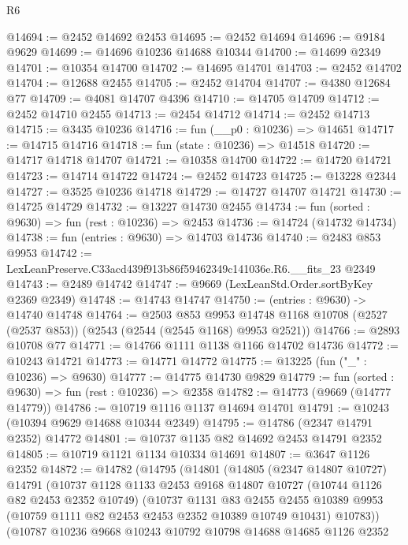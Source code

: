 \begin{lexlean}{R6}
\begin{coremodule}
@14694 := @2452 @14692 @2453
@14695 := @2452 @14694
@14696 := @9184 @9629
@14699 := @14696 @10236 @14688 @10344
@14700 := @14699 @2349
@14701 := @10354 @14700
@14702 := @14695 @14701
@14703 := @2452 @14702
@14704 := @12688 @2455
@14705 := @2452 @14704
@14707 := @4380 @12684 @77
@14709 := @4081 @14707 @4396
@14710 := @14705 @14709
@14712 := @2452 @14710 @2455
@14713 := @2454 @14712
@14714 := @2452 @14713
@14715 := @3435 @10236
@14716 := fun (__p0 : @10236) => @14651
@14717 := @14715 @14716
@14718 := fun (state : @10236) => @14518
@14720 := @14717 @14718 @14707
@14721 := @10358 @14700
@14722 := @14720 @14721
@14723 := @14714 @14722
@14724 := @2452 @14723
@14725 := @13228 @2344
@14727 := @3525 @10236 @14718
@14729 := @14727 @14707 @14721
@14730 := @14725 @14729
@14732 := @13227 @14730 @2455
@14734 := fun (sorted : @9630) => fun (rest : @10236) => @2453
@14736 := @14724 (@14732 @14734)
@14738 := fun (entries : @9630) => @14703 @14736
@14740 := @2483 @853 @9953
@14742 := LexLeanPreserve.C33acd439f913b86f59462349c141036e.R6.__fits_23 @2349
@14743 := @2489 @14742
@14747 := @9669 (LexLeanStd.Order.sortByKey @2369 @2349)
@14748 := @14743 @14747
@14750 := (entries : @9630) -> @14740 @14748
@14764 := @2503
    @853
    @9953
    @14748
    @1168
    @10708
    (@2527 (@2537 @853))
    (@2543 (@2544 (@2545 @1168) @9953 @2521))
@14766 := @2893 @10708 @77
@14771 := @14766 @1111 @1138 @1166 @14702 @14736
@14772 := @10243 @14721
@14773 := @14771 @14772
@14775 := @13225 (fun ("_" : @10236) => @9630)
@14777 := @14775 @14730 @9829
@14779 := fun (sorted : @9630) => fun (rest : @10236) => @2358
@14782 := @14773 (@9669 (@14777 @14779))
@14786 := @10719 @1116 @1137 @14694 @14701
@14791 := @10243 (@10394 @9629 @14688 @10344 @2349)
@14795 := @14786 (@2347 @14791 @2352) @14772
@14801 := @10737 @1135 @82 @14692 @2453 @14791 @2352
@14805 := @10719 @1121 @1134 @10334 @14691
@14807 := @3647 @1126 @2352
@14872 := @14782
    (@14795
      (@14801
        (@14805
          (@2347 @14807 @10727)
          @14791
          (@10737
            @1128
            @1133
            @2453
            @9168
            @14807
            @10727
            (@10744 @1126 @82 @2453 @2352 @10749)
            (@10737
              @1131
              @83
              @2455
              @2455
              @10389
              @9953
              (@10759 @1111 @82 @2453 @2453 @2352 @10389 @10749 @10431)
              @10783))
          (@10787
            @10236
            @9668
            @10243
            @10792
            @10798
            @14688
            @14685
            @1126
            @2352

\end{coremodule}
\end{lexlean}
